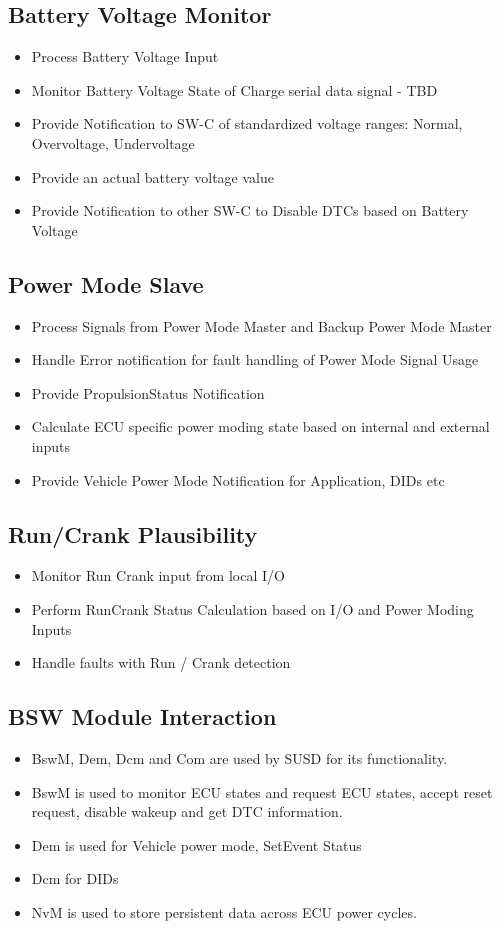 \subsection{Battery Voltage Monitor}
\begin{itemize}
\item Process Battery Voltage Input
\item Monitor Battery Voltage State of Charge serial data signal - TBD
\item Provide Notification to SW-C of standardized voltage ranges: Normal, Overvoltage, Undervoltage
\item Provide an actual battery voltage value
\item Provide Notification to other SW-C to Disable DTCs based on Battery Voltage
\end{itemize}

\subsection{Power Mode Slave}
\begin{itemize}
\item Process Signals from Power Mode Master and Backup Power Mode Master
\item Handle Error notification for fault handling of Power Mode Signal Usage
\item Provide PropulsionStatus Notification
\item Calculate ECU specific power moding state based on internal and external inputs
\item Provide Vehicle Power Mode Notification for Application, DIDs etc
\end{itemize}

\subsection{Run/Crank Plausibility}
\begin{itemize}
\item Monitor Run Crank input from local I/O
\item Perform RunCrank Status Calculation based on I/O and Power Moding Inputs
\item Handle faults with Run / Crank detection
\end{itemize}

\subsection{BSW Module Interaction}
\begin{itemize}
\item BswM, Dem, Dcm and Com are used by SUSD for its functionality. 
\item BswM is used to monitor ECU states and request ECU states, accept reset request, disable wakeup and get DTC information. 
\item Dem is used for Vehicle power mode, SetEvent Status
\item Dcm for DIDs
\item NvM is used to store persistent data across ECU power cycles.
\end{itemize}

